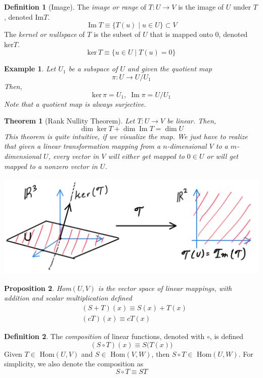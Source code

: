 \documentclass{article}
\DeclareMathOperator{\im}{Im}
\newtheorem{theorem}{Theorem}[section]
\newtheorem{proposition}[theorem]{Proposition}
\newtheorem{example}{Example}[section]
\theoremstyle{remark}
\theoremstyle{definition}
\newtheorem{definition}{Definition}[section]
\begin{document}
\begin{definition}[Image]
The \textit{image or range} of $T: U \longrightarrow V$ is the image of $U$ under $T$, denoted Im$T$. 
\[\im{T} \equiv \{ T(u) \; | \; u \in U\} \subset V\]
The \textit{kernel or nullspace} of $T$ is the subset of $U$ that is mapped onto $0$, denoted ker$T$. 
\[\text{ker}\,T \equiv \{ u \in U \; | \; T(u) = 0\} \]
\end{definition}

\begin{example}
Let $U_1$ be a subspace of $U$ and given the quotient map
\[ \pi: U \longrightarrow U / U_1\]
Then, 
\[\text{ker}\,\pi = U_1, \; \im{\pi} = U / U_1\]
Note that a quotient map is always surjective. 
\end{example}

\begin{theorem}[Rank Nullity Theorem]
Let $T: U \longrightarrow V$ be linear. Then, 
\[ \dim \ker T + \dim \im T = \dim U\]
This theorem is quite intuitive, if we visualize the map. We just have to realize that given a linear transformation mapping from a $n$-dimensional $V$ to a $m$-dimensional $U$, every vector in $V$ will either get mapped to $0 \in U$ or will get mapped to a nonzero vector in $U$. 
\begin{center}
    \includegraphics[scale=0.4]{Images/Rank_Nullity.PNG}
\end{center}
\end{theorem}

\begin{proposition}
Hom$(U, V)$ is the vector space of linear mappings, with addition and scalar multiplication defined
\begin{align*}
    & (S + T) (x) \equiv S(x) + T(x) \\
    & (c T) (x) \equiv c T(x)
\end{align*}
\end{proposition}

\begin{definition}
The \textit{composition} of linear functions, denoted with $\circ$, is defined
\[ (S \circ T) (x) \equiv S\big( T(x)\big) \]
Given $T \in $ Hom$(U, V)$ and $S \in $ Hom$(V, W)$, then $S \circ T \in $ Hom$(U, W)$. For simplicity, we also denote the composition as 
\[ S \circ T \equiv S T\]
\end{definition}
\end{document}
